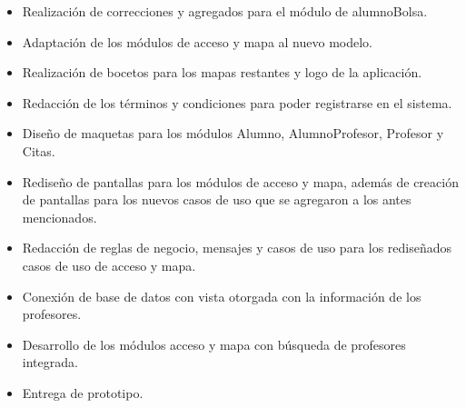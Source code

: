 \begin{itemize}
	\item Realización de correcciones y agregados para el módulo de alumnoBolsa.
	\item Adaptación de los módulos de acceso y mapa al nuevo modelo.
	\item Realización de bocetos para los mapas restantes y logo de la aplicación.
	\item Redacción de los términos y condiciones para poder registrarse en el sistema.
	\item Diseño de maquetas para los módulos Alumno, AlumnoProfesor, Profesor y Citas.
	\item Rediseño de pantallas para los módulos de acceso y mapa, además de creación de pantallas para los nuevos casos de uso que se agregaron a los antes mencionados.
	\item Redacción de reglas de negocio, mensajes y casos de uso para los rediseñados casos de uso de acceso y mapa.
	\item Conexión de base de datos con vista otorgada con la información de los profesores.
	\item Desarrollo de los módulos acceso y mapa con búsqueda de profesores integrada.
	\item Entrega de prototipo.
\end{itemize}